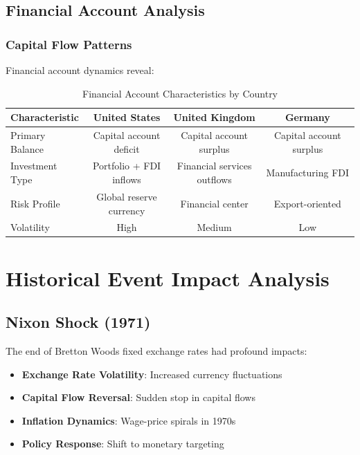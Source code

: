 \documentclass[11pt,a4paper]{article}
\begin{document}
\subsection{Financial Account Analysis}

\subsubsection{Capital Flow Patterns}
Financial account dynamics reveal:

\begin{table}[h]
\centering
\caption{Financial Account Characteristics by Country}
\begin{tabular}{lccc}
\toprule
\textbf{Characteristic} & \textbf{United States} & \textbf{United Kingdom} & \textbf{Germany} \\
\midrule
Primary Balance & Capital account deficit & Capital account surplus & Capital account surplus \\
Investment Type & Portfolio + FDI inflows & Financial services outflows & Manufacturing FDI \\
Risk Profile & Global reserve currency & Financial center & Export-oriented \\
Volatility & High & Medium & Low \\
\bottomrule
\end{tabular}
\end{table}

\section{Historical Event Impact Analysis}

\subsection{Nixon Shock (1971)}
The end of Bretton Woods fixed exchange rates had profound impacts:

\begin{itemize}
    \item \textbf{Exchange Rate Volatility}: Increased currency fluctuations
    \item \textbf{Capital Flow Reversal}: Sudden stop in capital flows
    \item \textbf{Inflation Dynamics}: Wage-price spirals in 1970s
    \item \textbf{Policy Response}: Shift to monetary targeting
\end{itemize}
\end{document}
